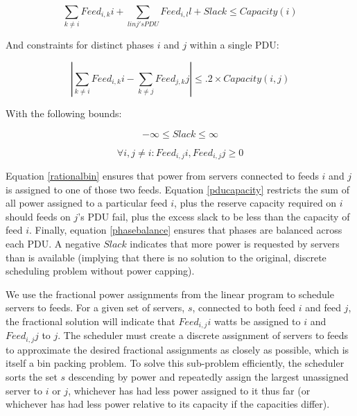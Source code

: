 \vspace{-.25 in}
\begin{equation}\label{pducapacity}
\displaystyle\sum_{k \neq i} Feed_{i,k}i + \displaystyle\sum_{l in j's PDU} Feed_{i,l}l + Slack \le Capacity(i) 
\end{equation}
\vspace{-.15 in}

And constraints for distinct phases $i$ and $j$ within a single PDU:

\vspace{-.2 in}
\begin{equation}\label{phasebalance}
|\displaystyle\sum_{k \neq i} Feed_{i,k}i - \displaystyle\sum_{k \neq j} Feed_{j,k}j| \le .2 \times Capacity(i,j)
\end{equation}
\vspace{-.15 in}

With the following bounds:

\vspace{-.2 in}
\begin{equation}\label{freeslack}
-\infty \le Slack \le \infty
\end{equation}
\vspace{-.15 in}

\vspace{-.25 in}
\begin{equation}\label{positivefeeds}
\forall i, j \ne i : Feed_{i,j}i, Feed_{i,j}j \ge 0
\end{equation}
\vspace{-.15 in}

Equation \ref{rationalbin} ensures that power from servers connected to feeds $i$ and $j$ is assigned to one of those two feeds.
Equation \ref{pducapacity} restricts the sum of all power assigned to a particular feed $i$, plus the reserve capacity required on $i$ should feeds on  $j$'s PDU fail, plus the excess slack to be less than the capacity of feed $i$. Finally, equation \ref{phasebalance} ensures that phases are balanced across each PDU. A negative $Slack$ indicates that more power is requested by servers than is available (implying that there is no solution to the original, discrete scheduling problem without power capping).

We use the fractional power assignments from the linear program to schedule servers to feeds.
For a given set of servers, $s$, connected to both feed $i$ and feed $j$, the fractional solution will indicate that $Feed_{i,j}i$ watts be assigned to $i$ and $Feed_{i,j}j$ to $j$.  The scheduler must create a discrete assignment of servers to feeds to approximate the desired fractional assignments as closely as possible, which is itself a bin packing problem.  To solve this sub-problem efficiently, the scheduler sorts the set $s$ descending by power and repeatedly assign the largest unassigned server to $i$ or $j$, whichever has had less power assigned to it thus far (or whichever has had less power relative to its capacity if the capacities differ).

